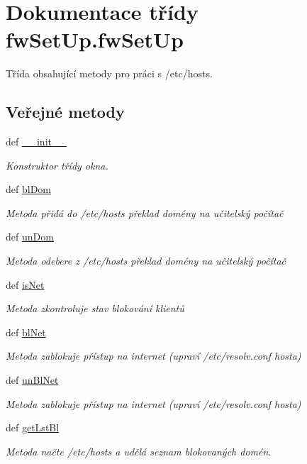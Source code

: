 \hypertarget{classfwSetUp_1_1fwSetUp}{\section{Dokumentace třídy fw\-Set\-Up.\-fw\-Set\-Up}
\label{dd/dd2/classfwSetUp_1_1fwSetUp}
}


Třída obsahující metody pro práci s /etc/hosts.  


\subsection*{Veřejné metody}
\begin{DoxyCompactItemize}
\item 
def \hyperlink{classfwSetUp_1_1fwSetUp_ad05f56aa9dd4503852ec2bcfb2a3afe2}{\-\_\-\-\_\-init\-\_\-\-\_\-}
\begin{DoxyCompactList}\small\item\em Konstruktor třídy okna. \end{DoxyCompactList}\item 
def \hyperlink{classfwSetUp_1_1fwSetUp_aea3760656409015f15b9b3450edd70e1}{bl\-Dom}
\begin{DoxyCompactList}\small\item\em Metoda přidá do /etc/hosts překlad domény na učitelský počítač \end{DoxyCompactList}\item 
def \hyperlink{classfwSetUp_1_1fwSetUp_a3a03c76b94db3bc750260ab64d76d755}{un\-Dom}
\begin{DoxyCompactList}\small\item\em Metoda odebere z /etc/hosts překlad domény na učitelský počítač \end{DoxyCompactList}\item 
def \hyperlink{classfwSetUp_1_1fwSetUp_a75a8c09d8493ac43747cb4c518bef7dd}{is\-Net}
\begin{DoxyCompactList}\small\item\em Metoda zkontroluje stav blokování klientů \end{DoxyCompactList}\item 
def \hyperlink{classfwSetUp_1_1fwSetUp_a4d21f86d17c54919fbdc2e3f069fa471}{bl\-Net}
\begin{DoxyCompactList}\small\item\em Metoda zablokuje přístup na internet (upraví /etc/resolv.conf hosta) \end{DoxyCompactList}\item 
def \hyperlink{classfwSetUp_1_1fwSetUp_a4f770f10b81c0030b1753dfb60452045}{un\-Bl\-Net}
\begin{DoxyCompactList}\small\item\em Metoda zablokuje přístup na internet (upraví /etc/resolv.conf hosta) \end{DoxyCompactList}\item 
def \hyperlink{classfwSetUp_1_1fwSetUp_a9d56382f2c43c78f6dcf2057580a5ed2}{get\-Lst\-Bl}
\begin{DoxyCompactList}\small\item\em Metoda načte /etc/hosts a udělá seznam blokovaných domén. \end{DoxyCompactList}\end{DoxyCompactItemize}

